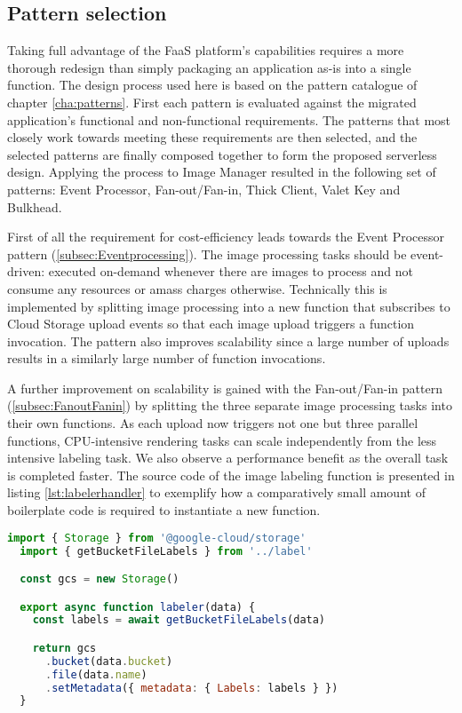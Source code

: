 \subsection{Pattern selection}

Taking full advantage of the FaaS platform's capabilities requires a more thorough redesign than simply packaging an application as-is into a single function. The design process used here is based on the pattern catalogue of chapter \ref{cha:patterns}. First each pattern is evaluated against the migrated application's functional and non-functional requirements. The patterns that most closely work towards meeting these requirements are then selected, and the selected patterns are finally composed together to form the proposed serverless design. Applying the process to Image Manager resulted in the following set of patterns: Event Processor, Fan-out/Fan-in, Thick Client, Valet Key and Bulkhead.

First of all the requirement for cost-efficiency leads towards the Event Processor pattern (\ref{subsec:Eventprocessing}). The image processing tasks should be event-driven: executed on-demand whenever there are images to process and not consume any resources or amass charges otherwise. Technically this is implemented by splitting image processing into a new function that subscribes to Cloud Storage upload events so that each image upload triggers a function invocation. The pattern also improves scalability since a large number of uploads results in a similarly large number of function invocations.

A further improvement on scalability is gained with the Fan-out/Fan-in pattern (\ref{subsec:FanoutFanin}) by splitting the three separate image processing tasks into their own functions. As each upload now triggers not one but three parallel functions, CPU-intensive rendering tasks can scale independently from the less intensive labeling task. We also observe a performance benefit as the overall task is completed faster. The source code of the image labeling function is presented in listing \ref{lst:labelerhandler} to exemplify how a comparatively small amount of boilerplate code is required to instantiate a new function.

\begin{lstlisting}[language=JavaScript,caption=Image labeler function handler,captionpos=b,label=lst:labelerhandler,showstringspaces=false,belowskip=2em,frame=tb,aboveskip=2em]
  import { Storage } from '@google-cloud/storage'
  import { getBucketFileLabels } from '../label'

  const gcs = new Storage()

  export async function labeler(data) {
    const labels = await getBucketFileLabels(data)

    return gcs
      .bucket(data.bucket)
      .file(data.name)
      .setMetadata({ metadata: { Labels: labels } })
  }
\end{lstlisting}

